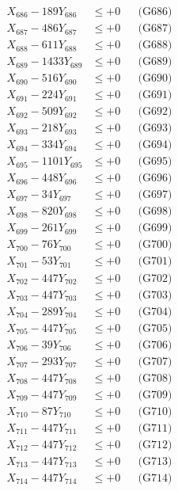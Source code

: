 \documentclass[a4paper,10pt]{article}
\begin{document}
{\begin{align}
X_{686} - 189Y_{686} &\leq +0 && \text{(G686)} \\
X_{687} - 486Y_{687} &\leq +0 && \text{(G687)} \\
X_{688} - 611Y_{688} &\leq +0 && \text{(G688)} \\
X_{689} - 1433Y_{689} &\leq +0 && \text{(G689)} \\
X_{690} - 516Y_{690} &\leq +0 && \text{(G690)} \\
\allowbreak
X_{691} - 224Y_{691} &\leq +0 && \text{(G691)} \\
X_{692} - 509Y_{692} &\leq +0 && \text{(G692)} \\
X_{693} - 218Y_{693} &\leq +0 && \text{(G693)} \\
X_{694} - 334Y_{694} &\leq +0 && \text{(G694)} \\
X_{695} - 1101Y_{695} &\leq +0 && \text{(G695)} \\
X_{696} - 448Y_{696} &\leq +0 && \text{(G696)} \\
X_{697} - 34Y_{697} &\leq +0 && \text{(G697)} \\
X_{698} - 820Y_{698} &\leq +0 && \text{(G698)} \\
X_{699} - 261Y_{699} &\leq +0 && \text{(G699)} \\
X_{700} - 76Y_{700} &\leq +0 && \text{(G700)} \\
\allowbreak
X_{701} - 53Y_{701} &\leq +0 && \text{(G701)} \\
X_{702} - 447Y_{702} &\leq +0 && \text{(G702)} \\
X_{703} - 447Y_{703} &\leq +0 && \text{(G703)} \\
X_{704} - 289Y_{704} &\leq +0 && \text{(G704)} \\
X_{705} - 447Y_{705} &\leq +0 && \text{(G705)} \\
X_{706} - 39Y_{706} &\leq +0 && \text{(G706)} \\
X_{707} - 293Y_{707} &\leq +0 && \text{(G707)} \\
X_{708} - 447Y_{708} &\leq +0 && \text{(G708)} \\
X_{709} - 447Y_{709} &\leq +0 && \text{(G709)} \\
X_{710} - 87Y_{710} &\leq +0 && \text{(G710)} \\
\allowbreak
X_{711} - 447Y_{711} &\leq +0 && \text{(G711)} \\
X_{712} - 447Y_{712} &\leq +0 && \text{(G712)} \\
X_{713} - 447Y_{713} &\leq +0 && \text{(G713)} \\
X_{714} - 447Y_{714} &\leq +0 && \text{(G714)} \\

\end{align}}
\end{document}
